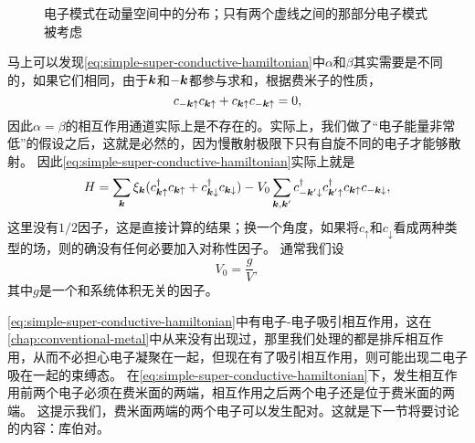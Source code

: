 \begin{figure}
    \centering
    
    \caption{电子模式在动量空间中的分布；只有两个虚线之间的那部分电子模式被考虑}
\end{figure}

马上可以发现\eqref{eq:simple-super-conductive-hamiltonian}中$\alpha$和$\beta$其实需要是不同的，如果它们相同，由于$\vb*{k}$和$- \vb*{k}$都参与求和，根据费米子的性质，
\[
    c_{- \vb*{k} \uparrow} c_{\vb*{k} \uparrow} + c_{\vb*{k} \uparrow} c_{- \vb*{k} \uparrow} = 0,
\]
因此$\alpha = \beta$的相互作用通道实际上是不存在的。实际上，我们做了“电子能量非常低”的假设之后，这就是必然的，因为慢散射极限下只有自旋不同的电子才能够散射。
因此\eqref{eq:simple-super-conductive-hamiltonian}实际上就是
\begin{equation}
    H = \sum_{\vb*{k}} \xi_{\vb*{k}} (c^\dagger_{\vb*{k} \uparrow} c_{\vb*{k} \uparrow} + c^\dagger_{\vb*{k} \downarrow} c_{\vb*{k} \downarrow}) - V_0 \sum_{\vb*{k}, \vb*{k}'} c^\dagger_{- \vb*{k}' \downarrow} c^\dagger_{\vb*{k}' \uparrow} c_{\vb*{k} \uparrow} c_{- \vb*{k} \downarrow},
    \label{eq:superconductivity-opposite-mom}
\end{equation}
这里没有$1/2$因子，这是直接计算的结果；换一个角度，如果将$c_\uparrow$和$c_\downarrow$看成两种类型的场，则的确没有任何必要加入对称性因子。
通常我们设
\begin{equation}
    V_0 = \frac{g}{V},
\end{equation}
其中$g$是一个和系统体积无关的因子。

\eqref{eq:simple-super-conductive-hamiltonian}中有电子-电子吸引相互作用，这在\autoref{chap:conventional-metal}中从来没有出现过，那里我们处理的都是排斥相互作用，从而不必担心电子凝聚在一起，但现在有了吸引相互作用，则可能出现二电子吸在一起的束缚态。
在\eqref{eq:simple-super-conductive-hamiltonian}下，发生相互作用前两个电子必须在费米面的两端，相互作用之后两个电子还是位于费米面的两端。
这提示我们，费米面两端的两个电子可以发生配对。这就是下一节将要讨论的内容：库伯对。

